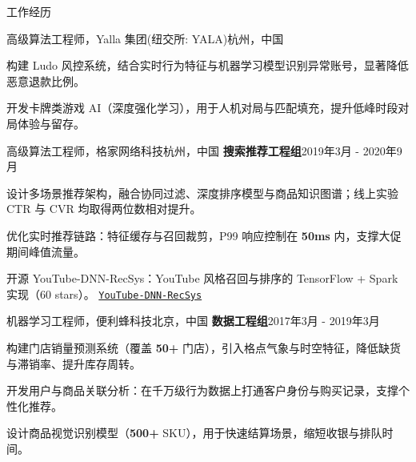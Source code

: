 \documentclass{resume} %
\newcommand{\repo}[2]{\href{#2}{\small\nolinkurl{#1}}}
\begin{document}
\begin{rSection}{工作经历}
\begin{rSubsection}{高级算法工程师，Yalla 集团(纽交所: YALA)}{杭州，中国}
\item {构建 Ludo 风控系统，结合实时行为特征与机器学习模型识别异常账号，显著降低恶意退款比例。}\\
\item {开发卡牌类游戏 AI（深度强化学习），用于人机对局与匹配填充，提升低峰时段对局体验与留存。}\\
\end{rSubsection}
\begin{rSubsection}{高级算法工程师，格家网络科技}{杭州，中国}
{\textbf{搜索推荐工程组}}{2019年3月 - 2020年9月}
\item {设计多场景推荐架构，融合协同过滤、深度排序模型与商品知识图谱；线上实验 CTR 与 CVR 均取得两位数相对提升。}\\
\item {优化实时推荐链路：特征缓存与召回裁剪，P99 响应控制在 {\textbf{50ms}} 内，支撑大促期间峰值流量。}\\
\item {开源 YouTube-DNN-RecSys：YouTube 风格召回与排序的 TensorFlow + Spark 实现（60 stars）。 \repo{YouTube-DNN-RecSys}{https://github.com/chenxingqiang/YouTube-DNN-RecSys}}\\
\end{rSubsection}
\begin{rSubsection}{机器学习工程师，便利蜂科技}{北京，中国}
{\textbf{数据工程组}}{2017年3月 - 2019年3月}
\item {构建门店销量预测系统（覆盖 {\textbf{50+}} 门店），引入格点气象与时空特征，降低缺货与滞销率、提升库存周转。}\\
\item {开发用户与商品关联分析：在千万级行为数据上打通客户身份与购买记录，支撑个性化推荐。}\\
\item {设计商品视觉识别模型（{\textbf{500+}} SKU），用于快速结算场景，缩短收银与排队时间。}\\
\end{rSubsection}



\end{rSection}
\end{document}
